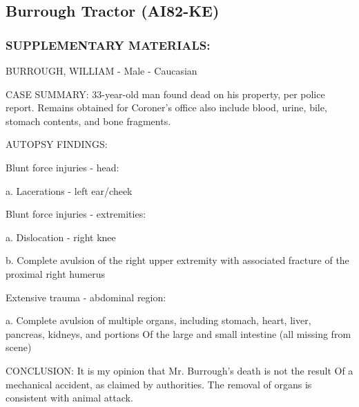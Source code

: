 \subsection*{Burrough Tractor (AI82-KE)}
\subsubsection*{SUPPLEMENTARY MATERIALS:}
\par [NOTE: Miscommunication led to a local coroner examining the
body of William Burrough]
\par BURROUGH, WILLIAM - Male - Caucasian
\par CASE SUMMARY: 33-year-old man found dead on his property,
per police report. Remains obtained for Coroner's office also
include blood, urine, bile, stomach contents, and bone fragments.
\par AUTOPSY FINDINGS:
\par Blunt force injuries - head:
\par a. Lacerations - left ear/cheek
\par Blunt force injuries - extremities:
\par a. Dislocation - right knee
\par b. Complete avulsion of the right upper extremity with associated
fracture of the proximal right humerus
\par Extensive trauma - abdominal region:
\par a. Complete avulsion of multiple organs, including stomach, heart,
liver, pancreas, kidneys, and portions Of the large and small
intestine (all missing from scene)
\par CONCLUSION: It is my opinion that Mr. Burrough's death is not
the result Of a mechanical accident, as claimed by authorities. The
removal of organs is consistent with animal attack.